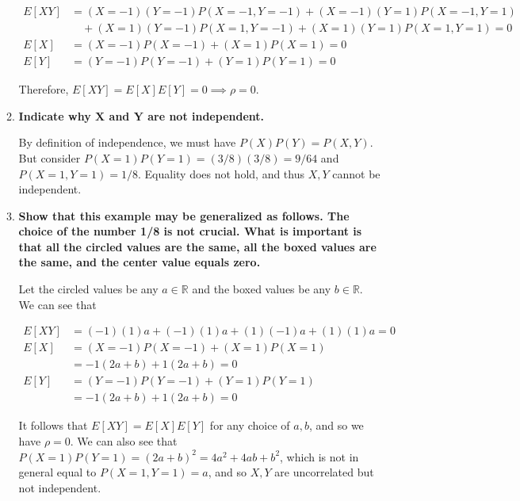 \documentclass[10pt, oneside]{article}   	%
\theoremstyle{definition}
\begin{document}
\begin{enumerate}[label=7.\arabic*]
\begin{enumerate}
	  \begin{align*}
	  E[XY] &= (X = -1)(Y = -1) P(X = -1, Y = -1) + (X = -1)(Y = 1) P(X = -1, Y = 1) \\
	  &\quad + (X = 1)(Y = -1) P(X = 1, Y = -1) + (X = 1)(Y = 1) P(X = 1, Y = 1) = 0  \\
	  E[X] &= (X = -1) P(X = -1) + (X = 1) P(X = 1) = 0 \\
	  E[Y] &= (Y = -1) P(Y = -1) + (Y = 1) P(Y = 1) = 0
	  \end{align*}
	  
	  Therefore, $\boxed{E[XY] = E[X] E[Y] = 0 \implies \rho = 0}$.
	  
	\item  \begin{tcolorbox}[
	  colback=Cerulean!5!white,
	  colframe=Cerulean!75!black]
	  \textbf{Indicate why $\bm{X}$ and $\bm{Y}$ are not independent.}
	  \end{tcolorbox}
	  
	  By definition of independence, we must have $P(X) P(Y) = P(X,Y)$. But consider $P(X = 1) P(Y = 1) = (3/8) (3/8) = 9/64$ and $P(X = 1, Y = 1) = 1/8$. Equality does not hold, and thus $X,Y$ cannot be independent.
	  
	\item  \begin{tcolorbox}[
	  colback=Cerulean!5!white,
	  colframe=Cerulean!75!black]
	  \textbf{Show that this example may be generalized as follows. The choice of the number 1/8 is not crucial. What is important is that all the circled values are the same, all the boxed values are the same, and the center value equals zero.}
	  \end{tcolorbox}
	  
	  Let the circled values be any $a \in \mathbb{R}$ and the boxed values be any $b \in \mathbb{R}$. We can see that
	  
	  \begin{align*}
	  E[XY] &= (-1)(1) a + (-1)(1) a + (1)(-1) a + (1)(1) a = 0 \\
	  E[X] &= (X = -1) P(X = -1) + (X = 1) P(X = 1) \\
	  &= -1 (2a + b) + 1 (2a + b) = 0 \\
	  E[Y] &= (Y = -1) P(Y = -1) + (Y = 1) P(Y = 1) \\
	  &= -1 (2a + b) + 1 (2a + b) = 0
	  \end{align*}
	  
	  It follows that $E[XY] = E[X]E[Y]$ for any choice of $a, b$, and so we have $\rho = 0$. We can also see that $P(X = 1) P(Y = 1) = (2a + b)^2 = 4a^2 + 4ab + b^2$, which is not in general equal to $P(X = 1, Y = 1) = a$, and so $X,Y$ are uncorrelated but not independent.
	\end{enumerate}


\end{enumerate}
\end{document}
